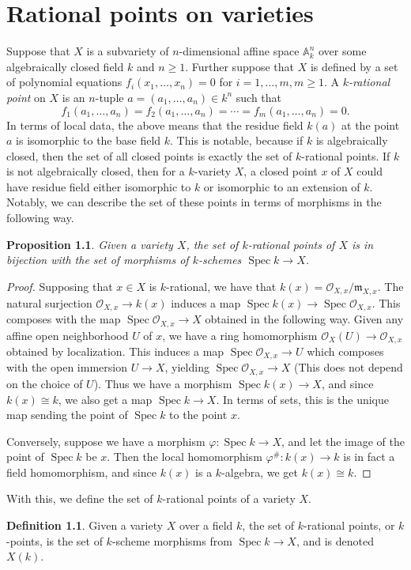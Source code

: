 \documentclass[12pt,twoside]{reedthesis}
\theoremstyle{plain}
\newtheorem{proposition}[theorem]{Proposition}
\theoremstyle{definition}
\newtheorem{definition}{Definition}[section]
\theoremstyle{remark}
\newcommand{\Affine}{\mathbb{A}}
\newcommand{\calO}{\mathcal{O}}
\newcommand{\Spec}{\operatorname{Spec}}
\begin{document}
\chapter{Rational points on varieties}
Suppose that $X$ is a subvariety of $n$-dimensional affine space $\Affine^n_k$ over some algebraically closed field $k$ and $n\geq1$. Further suppose that $X$ is defined by a set of polynomial equations $f_i(x_1,\ldots,x_n)=0$ for $i=1,\ldots,m, m\geq1.$  A \emph{$k$-rational point} on $X$ is an $n$-tuple $a=(a_1,\ldots,a_n)\in k^n$ such that \[f_1(a_1,\ldots,a_n)=f_2(a_1,\ldots,a_n)=\cdots=f_m(a_1,\ldots,a_n)=0.\] 
In terms of local data, the above means that the residue field $k(a)$ at the point $a$ is isomorphic to the base field $k$. This is notable, because if $k$ is algebraically closed, then the set of all closed points is exactly the set of $k$-rational points. If $k$ is not algebraically closed, then for a $k$-variety $X$, a closed point $x$ of $X$ could have residue field either isomorphic to $k$ or isomorphic to an extension of $k$. 
Notably, we can describe the set of these points in terms of morphisms in the following way.
\begin{proposition}
Given a variety $X$, the set of $k$-rational points of $X$ is in bijection with the set of morphisms of $k$-schemes $\Spec k\to X$.
\end{proposition}
\begin{proof}
Supposing that $x\in X$ is $k$-rational, we have that $k(x)=\calO_{X,x}/\mathfrak{m}_{X,x}$. The natural surjection $\calO_{X,x}\to k(x)$ induces a map $\Spec k(x)\to\Spec\calO_{X,x}$. This composes with the map $\Spec\calO_{X,x}\to X$ obtained in the following way. Given any affine open neighborhood $U$ of $x$, we have a ring homomorphism $\calO_X(U)\to\calO_{X,x}$ obtained by localization. This induces a map $\Spec\calO_{X,x}\to U$ which composes with the open immersion $U\to X$, yielding $\Spec\calO_{X,x}\to X$ (This does not depend on the choice of $U$). Thus we have a morphism $\Spec k(x)\to X$, and since $k(x)\cong k$, we also get a map $\Spec k\to X$. In terms of sets, this is the unique map sending the point of $\Spec k$ to the point $x$.

Conversely, suppose we have a morphism $\varphi:\Spec k\to X$, and let the image of the point of $\Spec k$ be $x$. Then the local homomorphism $\varphi^\#: k(x)\to k$ is in fact a field homomorphism, and since $k(x)$ is a $k$-algebra, we get $k(x)\cong k$.
\end{proof}

With this, we define the set of $k$-rational points of a variety $X$.

\begin{definition}
Given a variety $X$ over a field $k$, the set of $k$-rational points, or $k$-points, is the set of $k$-scheme morphisms from $\Spec k\to X$, and is denoted $X(k)$.
\end{definition}
\backmatter 
\nocite{*}



\end{document}
